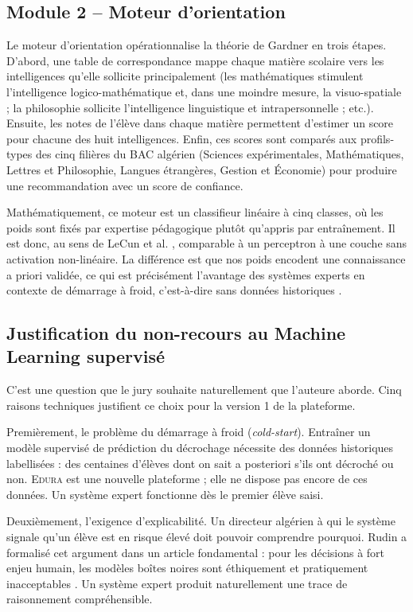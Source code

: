 \documentclass[12pt,a4paper,oneside]{report}
\newcommand{\edura}{\textsc{Edura}}
\begin{document}
\subsection{Module 2 -- Moteur d'orientation}

Le moteur d'orientation opérationnalise la théorie de Gardner \autocite{gardner1983frames} en trois étapes. D'abord, une table de correspondance mappe chaque matière scolaire vers les intelligences qu'elle sollicite principalement (les mathématiques stimulent l'intelligence logico-mathématique et, dans une moindre mesure, la visuo-spatiale ; la philosophie sollicite l'intelligence linguistique et intrapersonnelle ; etc.). Ensuite, les notes de l'élève dans chaque matière permettent d'estimer un score pour chacune des huit intelligences. Enfin, ces scores sont comparés aux profils-types des cinq filières du \ac{BAC} algérien (Sciences expérimentales, Mathématiques, Lettres et Philosophie, Langues étrangères, Gestion et Économie) pour produire une recommandation avec un score de confiance.

Mathématiquement, ce moteur est un classifieur linéaire à cinq classes, où les poids sont fixés par expertise pédagogique plutôt qu'appris par entraînement. Il est donc, au sens de LeCun et al. \autocite{lecun2015deep}, comparable à un perceptron à une couche sans activation non-linéaire. La différence est que nos poids encodent une connaissance a priori validée, ce qui est précisément l'avantage des systèmes experts en contexte de démarrage à froid, c'est-à-dire sans données historiques \autocite{rudin2019stop}.

\subsection{Justification du non-recours au Machine Learning supervisé}

C'est une question que le jury souhaite naturellement que l'auteure aborde. Cinq raisons techniques justifient ce choix pour la version 1 de la plateforme.

Premièrement, le problème du démarrage à froid (\textit{cold-start}). Entraîner un modèle supervisé de prédiction du décrochage nécessite des données historiques labellisées : des centaines d'élèves dont on sait a posteriori s'ils ont décroché ou non. \edura{} est une nouvelle plateforme ; elle ne dispose pas encore de ces données. Un système expert fonctionne dès le premier élève saisi.

Deuxièmement, l'exigence d'explicabilité. Un directeur algérien à qui le système signale qu'un élève est en risque élevé doit pouvoir comprendre pourquoi. Rudin a formalisé cet argument dans un article fondamental : pour les décisions à fort enjeu humain, les modèles boîtes noires sont éthiquement et pratiquement inacceptables \autocite{rudin2019stop}. Un système expert produit naturellement une trace de raisonnement compréhensible.
\end{document}
